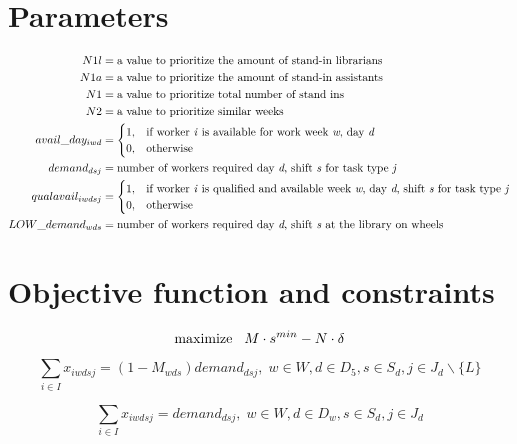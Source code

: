 \section{Parameters} \label{params}
\begin{align}
	N1l&= \text{a value to prioritize the amount of stand-in librarians}\\
	N1a&= \text{a value to prioritize the amount of stand-in assistants}\\
	N1&= \text{a value to prioritize total number of stand ins}\\
	N2&= \text{a value to prioritize similar weeks}\\
	avail\_day_{iwd}&=
	\begin{cases}
		1, & \text{if worker \textit{i} is available for work week \textit{w}, day \textit{d}} \\
		0, & \text{otherwise}
	\end{cases}\\
	demand_{dsj}&= \text{number of workers required day \textit{d}, shift \textit{s} for task type \textit{j}}\\
	qualavail_{iwdsj}&=
	\begin{cases}
		1, & \text{if worker \textit{i} is qualified and available week \textit{w}, day \textit{d}, shift \textit{s} for task type \textit{j}} \\
		0, & \text{otherwise}
	\end{cases}\\
	LOW\_demand_{wds}&= \text{number of workers required day \textit{d}, shift \textit{s} at the library on wheels}
\end{align}

\section{Objective function and constraints} \label{app:constr}
\begin{equation} \label{app:objfcn}
\text{maximize} \hspace{0.3cm} M\cdot s^{min} - N \cdot \delta
\end{equation}

\begin{equation}
\sum_{i \in I} x_{iwdsj} = (1-M_{wds})demand_{dsj}, \;   w\in W, d\in D_5, s\in S_d, j\in J_d\backslash \{L\}
\end{equation}

\begin{equation}
\sum_{i \in I} x_{iwdsj} = demand_{dsj}, \;   w\in W,d\in D_w,s\in S_d,j\in J_d
\end{equation}

